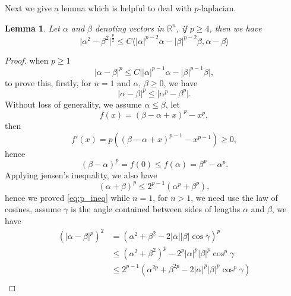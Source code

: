 \documentclass[11pt]{amsart}
\newtheorem{lemma}[theorem]{Lemma}
\theoremstyle{definition}
\numberwithin{equation}{section}
\newcommand*\abs[1]{\lvert#1\rvert}
\newcommand\R{\mathbb{R}}
\begin{document}
Next we give a lemma which is helpful to deal with $p$-laplacian.
\begin{lemma}\label{lem:VecIneq}
	Let $\alpha$ and $\beta$ denoting vectors in $\R^{n}$, if $p \geq 4$, then we have
	\begin{equation}
		\abs{\alpha^2 - \beta^2}^{\frac{p}{2}}
		\leq C \langle \abs{\alpha}^{p-2}\alpha - \abs{\beta}^{p-2}\beta, \alpha-\beta\rangle
	\end{equation}
\end{lemma}
\begin{proof}
	when $p \geq 1 $
	\begin{equation}\label{eq:p_ineq}
		\abs{\alpha-\beta}^p \leq C\abs{\abs{\alpha}^{p-1}\alpha - \abs{\beta}^{p-1}\beta},
	\end{equation}
	to prove this, firstly, for $n = 1$ and $\alpha$, $\beta \geq 0$, we have
	\begin{equation}
		\abs{\alpha-\beta}^p \leq \abs{\alpha^p - \beta^p}.
	\end{equation}
	Without loss of generality, we assume $\alpha \leq \beta$, let
	\begin{equation}
		f(x) = (\beta-\alpha+x)^p - x^p,
	\end{equation}
	then
	\begin{equation}
		f'(x) = p\left((\beta-\alpha+x)^{p-1} - x^{p-1}\right) \geq 0,
	\end{equation}
	hence
	\begin{equation}
		\left(\beta-\alpha\right)^p = f(0) \leq f(\alpha) = \beta^p - \alpha^p.
	\end{equation}
	Applying jensen's inequality, we also have
	\begin{equation}
		\left(\alpha+\beta\right)^p \leq 2^{p-1}\left(\alpha^p + \beta^p\right),
	\end{equation}
	hence we proved \cref{eq:p_ineq} while $n = 1$, for $n > 1$, we need use
	the law of cosines, assume $\gamma$ is the angle contained between sides
	of lengths $\alpha$ and $\beta$, we have
	\begin{equation}
		\begin{split}
			\left(\abs{\alpha-\beta}^p\right)^2
			&= \left(\alpha^2 + \beta^2 - 2 \abs{\alpha}\abs{\beta}\cos{\gamma}\right)^p\\
			&\leq \left(\alpha^2+\beta^2\right)^p - 2^p\abs{\alpha}^p\abs{\beta}^p\cos^p{\gamma}\\
			&\leq 2^{p-1}\left(\alpha^{2p} + \beta^{2p} - 2\abs{\alpha}^p\abs{\beta}^p\cos^p{\gamma}\right)\\

\end{split}
\end{equation}
\end{proof}
\end{document}
